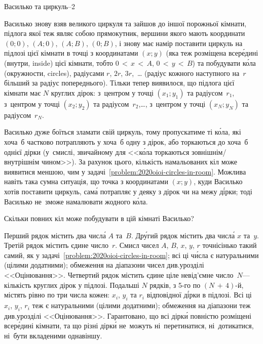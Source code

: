 {

\begin{problemAllDefault}{Василько та циркуль--2}

Василько знову взяв великого циркуля та зайшов до іншої порожньої кімнати, підлога якої теж являє собою прямокутник, вершини якого мають координати $(0;0)$, $(A; 0)$, $(A; B)$, $(0; B)$, і знову має намір поставити циркуль на підлозі цієї кімнати в точці з координатами $(x;y)$ (яка  теж розміщена всер\'{е}дині (внутри, inside) цієї кімнати, тобто ${0\,{<}\,x\,{<}\,A}$, ${0\,{<}\,y\,{<}\,B}$) та побудувати к\'{о}ла (окружности, circles), радіусами $r$, $2r$, $3r$,~\dots{} (радіус кожного наступного на~$r$ більший за радіус попереднього). Тільки тепер виявилося, що підлога цієї кімнати має $N$ круглих дірок:
з~центром у точці $(x_1;y_1)$ та радіусом~$r_1$, 
з~центром у точці $(x_2;y_2)$ та радіусом~$r_2$,\nolinebreak[3] \dots,
з~центром у точці $(x_N;y_N)$ та радіусом~$r_N$. 

Василько дуже боїться зламати свій циркуль, тому пропускатиме ті к\'{о}ла, які хоча~б частково потрапляють у хоча~б одну з дірок, або торкаються до хоча~б однієї дірки (у~смислі, звичайному для <<к\'{о}ла торкаються зовнішнім/внутрішнім чином>>). За рахунок цього, кількість намальованих кіл може виявитися меншою, чим у задачі~\ref{problem:2020oioi-circles-in-room}. Можлива навіть така сумна ситуація, що точка з координатами $(x;y)$, куди Василько хотів поставити циркуль, сам\'{а} потрапляє у деяку з дірок чи на межу д\'{і}рки; тоді Василько не~зможе намалювати жодного к\'{о}ла.

Скільки повних кіл може побудувати в цій кімнаті Василько?

\InputFile
Перший рядок містить два числ\'{а} $A$ та~$B$.
Др\'{у}гий рядок містить два числ\'{а} $x$ та~$y$.
Третій рядок містить єдине число~$r$.
Смисл чисел $A$, $B$, $x$, $y$, $r$ точнісінько такий самий, як у задачі~\ref{problem:2020oioi-circles-in-room}; всі ці ч\'{и}сла є натуральними (цілими додатними); обмеження на діапазони чисел див.\nolinebreak[2] у\nolinebreak[3] розділі <<Оцінювання>>.
Четвертий рядок містить єдине ціле невід'ємне число~$N$\nolinebreak[3] --- кількість круглих дірок у підлозі.
Подальші $N$ рядків, з \mbox{5-го} по \mbox{$(N\,{+}\,4)$-й}, містять рівно по три числа кожен: $x_i$, $y_i$ та $r_i$ відповідної д\'{і}рки в підлозі. Всі ці $x_i$, $y_i$, $r_i$ теж є натуральними (цілими додатними); обмеження на діапазони теж див.\nolinebreak[2] у\nolinebreak[3] розділі <<Оцінювання>>. Гарантовано, що всі дірк\'{и} повністю розміщені всер\'{е}дині кімнати, та що різні дірк\'{и} не~можуть ні~перетинатися, ні~дотикатися, ні~бути вкладеними одна\nolinebreak[2] в\nolinebreak[3] іншу.


\end{problemAllDefault}}
